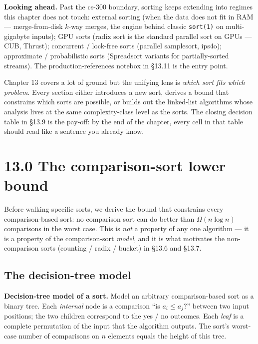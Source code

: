\documentclass[11pt]{article}
\begin{document}
\begin{ideabox}
\textbf{Looking ahead.} Past the cs-300 boundary, sorting keeps
extending into regimes this chapter does not touch: external
sorting (when the data does not fit in RAM --- merge-from-disk
$k$-way merges, the engine behind classic \texttt{sort(1)} on
multi-gigabyte inputs); GPU sorts (radix sort is the standard
parallel sort on GPUs --- CUB, Thrust); concurrent / lock-free
sorts (parallel samplesort, ips4o); approximate / probabilistic
sorts (Spreadsort variants for partially-sorted streams). The
production-references notebox in \S13.11 is the entry point.
\end{ideabox}

\begin{ideabox}
Chapter 13 covers a lot of ground but the unifying lens is
\emph{which sort fits which problem}. Every section either
introduces a new sort, derives a bound that constrains which sorts
are possible, or builds out the linked-list algorithms whose
analysis lives at the same complexity-class level as the sorts.
The closing decision table in \S13.9 is the pay-off: by the end of
the chapter, every cell in that table should read like a sentence
you already know.
\end{ideabox}

\section{13.0 The comparison-sort lower bound}

Before walking specific sorts, we derive the bound that constrains
every comparison-based sort: no comparison sort can do better than
$\Omega(n \log n)$ comparisons in the worst case. This is
\emph{not} a property of any one algorithm --- it is a property of
the comparison-sort \emph{model}, and it is what motivates the
non-comparison sorts (counting / radix / bucket) in \S13.6 and
\S13.7.

\subsection*{The decision-tree model}

\begin{defnbox}
\textbf{Decision-tree model of a sort.} Model an arbitrary
comparison-based sort as a binary tree. Each \emph{internal} node
is a comparison ``is $a_i \le a_j$?'' between two input positions;
the two children correspond to the yes / no outcomes. Each
\emph{leaf} is a complete permutation of the input that the
algorithm outputs. The sort's worst-case number of comparisons on
$n$ elements equals the height of this tree.
\end{defnbox}
\end{document}
